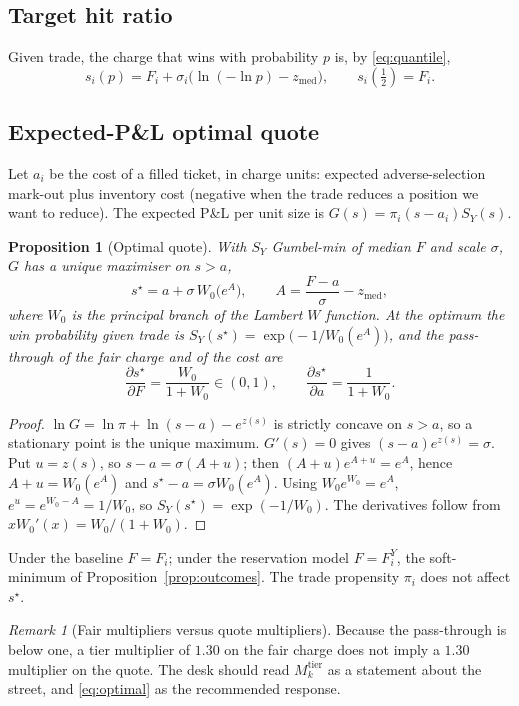 \documentclass[11pt,a4paper]{article}
\newtheorem{proposition}{Proposition}
\theoremstyle{definition}
\theoremstyle{remark}
\newtheorem{remark}{Remark}
\newcommand{\zm}{z_{\mathrm{med}}}
\newcommand{\Wo}{W_0}
\begin{document}
\subsection{Target hit ratio}
Given trade, the charge that wins with probability $p$ is, by \eqref{eq:quantile},
\begin{equation}\label{eq:target}
s_i(p)=F_i+\sigma_i\bigl(\ln(-\ln p)-\zm\bigr),\qquad s_i(\tfrac12)=F_i .
\end{equation}

\subsection{Expected-P\&L optimal quote}
Let $a_i$ be the cost of a filled ticket, in charge units: expected adverse-selection mark-out plus inventory cost (negative when the trade reduces a position we want to reduce). The expected P\&L per unit size is $G(s)=\pi_i(s-a_i)S_Y(s)$.

\begin{proposition}[Optimal quote]\label{prop:optimal}
With $S_Y$ Gumbel-min of median $F$ and scale $\sigma$, $G$ has a unique maximiser on $s>a$,
\begin{equation}\label{eq:optimal}
\boxed{\;
s^\star=a+\sigma\,\Wo\!\bigl(e^{A}\bigr),\qquad A=\frac{F-a}{\sigma}-\zm ,
\;}
\end{equation}
where $\Wo$ is the principal branch of the Lambert $W$ function. At the optimum the win probability given trade is $S_Y(s^\star)=\exp\bigl(-1/\Wo(e^A)\bigr)$, and the pass-through of the fair charge and of the cost are
\[
\frac{\partial s^\star}{\partial F}=\frac{\Wo}{1+\Wo}\in(0,1),\qquad\frac{\partial s^\star}{\partial a}=\frac{1}{1+\Wo}.
\]
\end{proposition}
\begin{proof}
$\ln G=\ln\pi+\ln(s-a)-e^{z(s)}$ is strictly concave on $s>a$, so a stationary point is the unique maximum. $G'(s)=0$ gives $(s-a)e^{z(s)}=\sigma$. Put $u=z(s)$, so $s-a=\sigma(A+u)$; then $(A+u)e^{A+u}=e^{A}$, hence $A+u=\Wo(e^A)$ and $s^\star-a=\sigma\Wo(e^A)$. Using $\Wo e^{\Wo}=e^A$, $e^{u}=e^{\Wo-A}=1/\Wo$, so $S_Y(s^\star)=\exp(-1/\Wo)$. The derivatives follow from $x\Wo'(x)=\Wo/(1+\Wo)$.
\end{proof}

Under the baseline $F=F_i$; under the reservation model $F=F^Y_i$, the soft-minimum of Proposition~\ref{prop:outcomes}. The trade propensity $\pi_i$ does not affect $s^\star$.

\begin{remark}[Fair multipliers versus quote multipliers]
Because the pass-through is below one, a tier multiplier of $1.30$ on the fair charge does not imply a $1.30$ multiplier on the quote. The desk should read $M^{\mathrm{tier}}_k$ as a statement about the street, and \eqref{eq:optimal} as the recommended response.
\end{remark}
\end{document}
